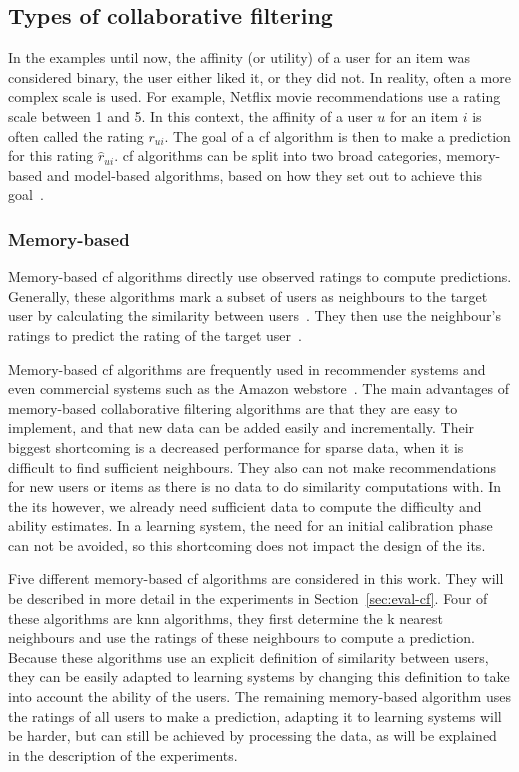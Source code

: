 \subsection{Types of collaborative filtering}
In the examples until now, the affinity (or utility) of a user for an item was considered binary, the user either liked it, or they did not.
In reality, often a more complex scale is used.
For example, Netflix movie recommendations use a rating scale between 1 and 5.
In this context, the affinity of a user $u$ for an item $i$ is often called the rating $r_{ui}$.
The goal of a \gls{cf} algorithm is then to make a prediction for this rating $\hat{r}_{ui}$.
\Gls{cf} algorithms can be split into two broad categories, memory-based and model-based algorithms, based on how they set out to achieve this goal~\cite{li2021novel,sharma2017collaborative,yu2004probabilistic,breese2013empirical,su2009survey}.

\subsubsection{Memory-based}
Memory-based \gls{cf} algorithms directly use observed ratings to compute predictions.
Generally, these algorithms mark a subset of users as neighbours to the target user by calculating the similarity between users~\cite{li2021novel,Hug2020}.
They then use the neighbour's ratings to predict the rating of the target user~\cite{su2009survey,Hug2020,Koren2010,Ricci2010}.

Memory-based \gls{cf} algorithms are frequently used in recommender systems and even commercial systems such as the Amazon webstore~\cite{sharma2017collaborative,yu2004probabilistic}.
The main advantages of memory-based collaborative filtering algorithms are that they are easy to implement, and that new data can be added easily and incrementally.
Their biggest shortcoming is a decreased performance for sparse data, when it is difficult to find sufficient neighbours.
They also can not make recommendations for new users or items as there is no data to do similarity computations with.
In the \gls{its} however, we already need sufficient data to compute the difficulty and ability estimates.
In a learning system, the need for an initial calibration phase can not be avoided, so this shortcoming does not impact the design of the \gls{its}.

Five different memory-based \gls{cf} algorithms are considered in this work. 
They will be described in more detail in the experiments in Section~\ref{sec:eval-cf}.
Four of these algorithms are \gls{knn} algorithms, they first determine the k nearest neighbours and use the ratings of these neighbours to compute a prediction.
Because these algorithms use an explicit definition of similarity between users, they can be easily adapted to learning systems by changing this definition to take into account the ability of the users.
The remaining memory-based algorithm uses the ratings of all users to make a prediction, adapting it to learning systems will be harder, but can still be achieved by processing the data, as will be explained in the description of the experiments.

